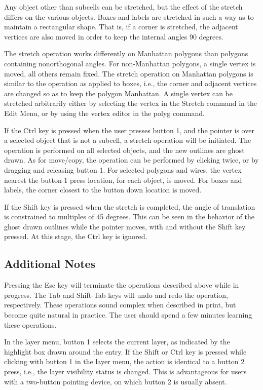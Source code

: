 Any object other than subcells can be stretched, but the effect of the
stretch differs on the various objects.  Boxes and labels are
stretched in such a way as to maintain a rectangular shape.  That is,
if a corner is stretched, the adjacent vertices are also moved in
order to keep the internal angles 90 degrees.

The stretch operation works differently on Manhattan polygons than
polygons containing nonorthogonal angles.  For non-Manhattan polygons,
a single vertex is moved, all others remain fixed.  The stretch
operation on Manhattan polygons is similar to the operation as applied
to boxes, i.e., the corner and adjacent vertices are changed so as to
keep the polygon Manhattan.  A single vertex can be stretched
arbitrarily either by selecting the vertex in the {\cb Stretch}
command in the {\cb Edit Menu}, or by using the vertex editor in the
{\cb polyg} command.

If the {\kb Ctrl} key is pressed when the user presses button 1, and
the pointer is over a selected object that is not a subcell, a stretch
operation will be initiated.  The operation is performed on all
selected objects, and the new outlines are ghost drawn.  As for
move/copy, the operation can be performed by clicking twice, or by
dragging and releasing button 1.  For selected polygons and wires, the
vertex nearest the button 1 press location, for each object, is moved. 
For boxes and labels, the corner closest to the button down location
is moved.

If the {\kb Shift} key is pressed when the stretch is completed, the
angle of translation is constrained to multiples of 45 degrees.  This
can be seen in the behavior of the ghost drawn outlines while the
pointer moves, with and without the {\kb Shift} key pressed.  At this
stage, the {\kb Ctrl} key is ignored.

\subsection{Additional Notes}

Pressing the {\kb Esc} key will terminate the operations described
above while in progress.  The {\kb Tab} and {\kb Shift-Tab} keys will
undo and redo the operation, respectively.  These operations sound
complex when described in print, but become quite natural in practice. 
The user should spend a few minutes learning these operations.

In the layer menu, button 1 selects the current layer, as indicated
by the highlight box drawn around the entry.  If the {\kb Shift} or
{\kb Ctrl} key is pressed while clicking with button 1 in the layer
menu, the action is identical to a button 2 press, i.e., the layer
visibility status is changed.  This is advantageous for users with a
two-button pointing device, on which button 2 is usually absent.

